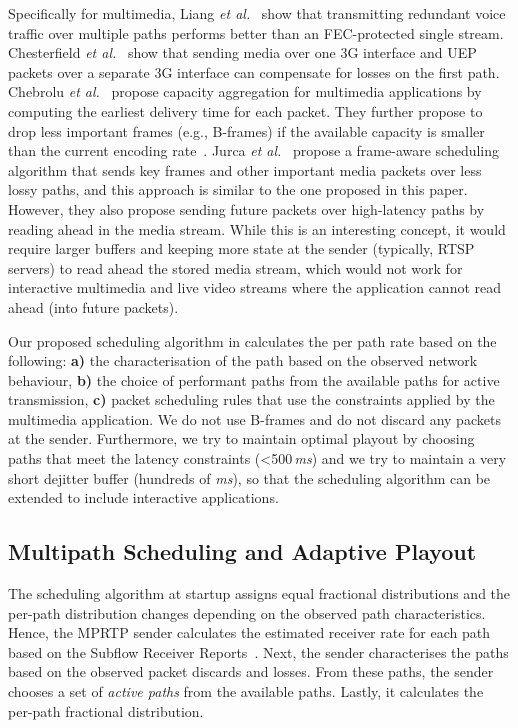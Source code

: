 Specifically for multimedia, Liang \emph{et al.}~\cite{Liang01} show that
transmitting redundant voice traffic over multiple paths performs better than 
an FEC-protected single stream. Chesterfield \emph{et al.}~\cite{1498479}
show that sending media over one 3G interface and UEP packets over a separate 
3G interface can compensate for losses on the first path. 
Chebrolu \emph{et al.}~\cite{1599407} propose capacity aggregation for
multimedia applications by computing the earliest delivery time for each
packet. They further propose to drop less important frames (e.g., B-frames) if
the available capacity is smaller than the current encoding
rate~\cite{1313320}. Jurca \emph{et al.}~\cite{4130370:jurca} propose a
frame-aware scheduling algorithm that sends key frames and other important
media packets over less lossy paths, and this approach is similar to the one
proposed in this paper. However, they also propose sending future packets over
high-latency paths by reading ahead in the media stream. While this is an
interesting concept, it would require larger buffers and keeping more state at the
sender (typically, RTSP servers) to read ahead the stored media stream, which
would not work for interactive multimedia and live video streams where the 
application cannot read ahead (into future packets).

Our proposed scheduling algorithm in  calculates the per path
rate based on the following: \textbf{a)} the characterisation of the path based on
the observed network behaviour, \textbf{b)} the choice of performant paths from the
available paths for active transmission, \textbf{c)} packet scheduling
rules that use the constraints applied by the multimedia application. We do
not use B-frames and do not discard any packets at the sender. Furthermore, we
try to maintain optimal playout by choosing paths that meet the latency
constraints (<500\,\emph{ms}) and we try to maintain a very short dejitter
buffer (hundreds of \emph{ms}), so that the scheduling algorithm can be extended
to include interactive applications.

\subsection{Multipath Scheduling and Adaptive Playout}

The scheduling algorithm at startup assigns equal fractional distributions and
the per-path distribution changes depending on the observed path
characteristics. Hence, the MPRTP sender calculates the estimated receiver
rate for each path based on the Subflow Receiver Reports~\cite{draft.mprtp}.
Next, the sender characterises the paths based on the observed packet discards
and losses. From these paths, the sender chooses a set of \emph{active paths}
from the available paths. Lastly, it calculates the per-path fractional
distribution.

